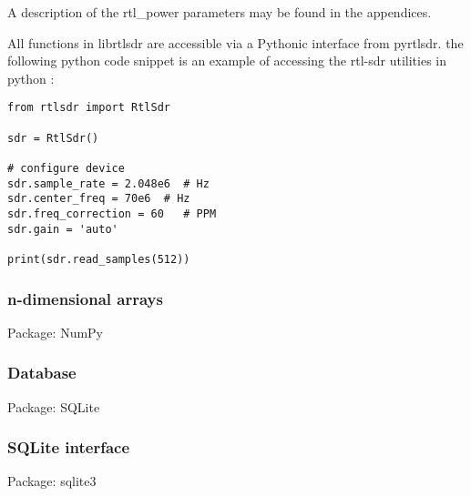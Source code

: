 A description of the rtl\_power parameters may be found in the appendices.

All functions in librtlsdr are accessible via a Pythonic interface from pyrtlsdr.
the following python code snippet is an example of accessing the rtl-sdr utilities in python :

\begin{lstlisting}
from rtlsdr import RtlSdr

sdr = RtlSdr()

# configure device
sdr.sample_rate = 2.048e6  # Hz
sdr.center_freq = 70e6 	# Hz
sdr.freq_correction = 60   # PPM
sdr.gain = 'auto'

print(sdr.read_samples(512))
\end{lstlisting}

\subsubsection{n-dimensional arrays}
Package:	NumPy

\subsubsection{Database}
Package:	SQLite

\subsubsection{SQLite interface}
Package:	sqlite3
    
    
    
    
    
    
    
    
    
    
    
    
    
    
    
    
    
    